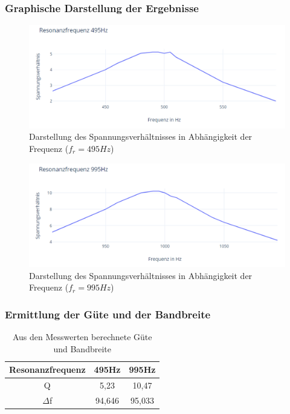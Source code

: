 \documentclass{article}
\begin{document}
\newpage

\subsubsection{Graphische Darstellung der Ergebnisse}
\begin{figure}[h]
  \begin{center}
    \includegraphics[scale=0.75]{../assets/images/ETP3/Fre495Plot1.PNG}
    \caption{Darstellung des Spannungsverhältnisses in Abhängigkeit der Frequenz ($f_r = 495Hz$)}
  \end{center}
\end{figure}

\begin{figure}[h]
  \begin{center}
    \includegraphics[scale=0.75]{../assets/images/ETP3/Fre995Plot2.PNG}
    \caption{Darstellung des Spannungsverhältnisses in Abhängigkeit der Frequenz ($f_r = 995Hz$)}
  \end{center}
\end{figure}

\newpage

\subsubsection{Ermittlung der Güte und der Bandbreite}

\begin{table}[h]
  \begin{center}
    \begin{tabular}{|c|c|c|}
      \hline
      Resonanzfrequenz & 495Hz  & 995Hz  \\
      \hline
      Q                & 5,23   & 10,47  \\
      \hline
      $\Delta$f        & 94,646 & 95,033 \\
      \hline
    \end{tabular}
    \caption{Aus den Messwerten berechnete Güte und Bandbreite}
    \label{tab:eMGB}
  \end{center}
\end{table}
\end{document}
